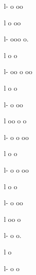 {     l-                                                                
o                             oo               

     l                                                                 
o                              oo              

     l-                                                                
ooo                               o.             

     l                                                                 
o                                 o             

     l-                                                                
oo    o                                 oo            

     l                                                                 
o                                  o            

     l-                                                                
o                                   oo           

     l                                                                 
oo  o                                    o           

     l-                                                                o
o                                    oo          

     l                                                                 
o                                     o          

     l-                                                                
o   o                                      oo         

     l                                                                 
o                                       o         

     l-                                                                
o                                       oo        

     l                                                                 
oo                                        o        

     l-                                                                
o                                         o.       

     l                                                                 
o       

     l-                                                                
o                                          o       

}
